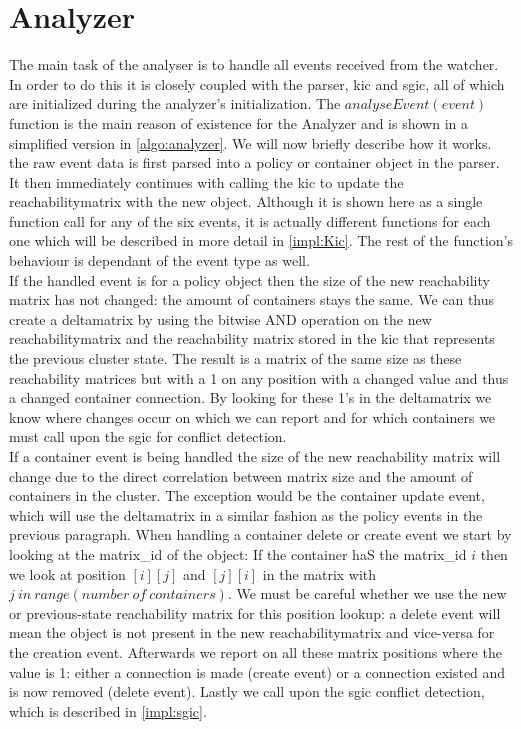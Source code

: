 \section{Analyzer} \label{impl:analyzer} The main task of the analyser is to handle all events received from the watcher. In order to do this it is closely coupled with the parser, \acrlong{kic} and \acrlong{sgic}, all of which are initialized during the analyzer's initialization. The $analyseEvent(event)$ function is the main reason of existence for the Analyzer and is shown in a simplified version in \autoref{algo:analyzer}. We will now briefly describe how it works.
\\[10pt]
the raw event data is first parsed into a policy or container object in the parser. It then immediately continues with calling the \acrshort{kic} to update the reachabilitymatrix with the new object. Although it is shown here as a single function call for any of the six events, it is actually different functions for each one which will be described in more detail in \autoref{impl:Kic}. The rest of the function's behaviour is dependant of the event type as well.
\\[10pt]
If the handled event is for a policy object then the size of the new reachability matrix has not changed: the amount of containers stays the same. We can thus create a deltamatrix by using the bitwise AND operation on the new reachabilitymatrix and the reachability matrix stored in the \acrshort{kic} that represents the previous cluster state. The result is a matrix of the same size as these reachability matrices but with a 1 on any position with a changed value and thus a changed container connection. By looking for these 1's in the deltamatrix we know where changes occur on which we can report and for which containers we must call upon the \acrshort{sgic} for conflict detection.
\\[10pt]
If a container event is being handled the size of the new reachability matrix will change due to the direct correlation between matrix size and the amount of containers in the cluster. The exception would be the container update event, which will use the deltamatrix in a similar fashion as the policy events in the previous paragraph. When handling a container delete or create event we start by looking at the matrix\_id of the object: If the container haS the matrix\_id $i$ then we look at position $[i][j]$ and $[j][i]$ in the matrix with $j\ in\ range(number\ of\ containers)$. We must be careful whether we use the new or previous-state reachability matrix for this position lookup: a delete event will mean the object is not present in the new reachabilitymatrix and vice-versa for the creation event. Afterwards we report on all these matrix positions where the value is 1: either a connection is made (create event) or a connection existed and is now removed (delete event). Lastly we call upon the \acrshort{sgic} conflict detection, which is described in \autoref{impl:sgic}.

